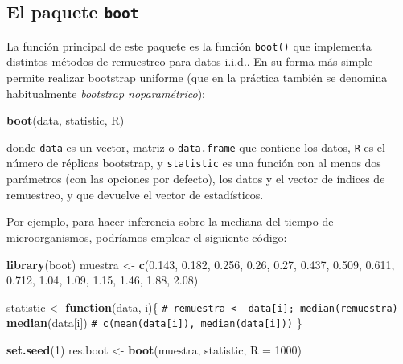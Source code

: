 \documentclass[
]{book}
\newenvironment{Shaded}{\begin{snugshade}}{\end{snugshade}}
\newcommand{\AttributeTok}[1]{\textcolor[rgb]{0.13,0.29,0.53}{#1}}
\newcommand{\CommentTok}[1]{\textcolor[rgb]{0.56,0.35,0.01}{\textit{#1}}}
\newcommand{\ControlFlowTok}[1]{\textcolor[rgb]{0.13,0.29,0.53}{\textbf{#1}}}
\newcommand{\DecValTok}[1]{\textcolor[rgb]{0.00,0.00,0.81}{#1}}
\newcommand{\FloatTok}[1]{\textcolor[rgb]{0.00,0.00,0.81}{#1}}
\newcommand{\FunctionTok}[1]{\textcolor[rgb]{0.13,0.29,0.53}{\textbf{#1}}}
\newcommand{\NormalTok}[1]{#1}
\newcommand{\OtherTok}[1]{\textcolor[rgb]{0.56,0.35,0.01}{#1}}
\theoremstyle{break}
\theoremstyle{nonumberplain}
\renewcommand{\CommentTok}[1]{\textcolor[rgb]{0.41,0.41,0.41}{\texttt{#1}}}
\begin{document}
\subsection{\texorpdfstring{El paquete \texttt{boot}}{El paquete boot}}\label{intro-pkgboot}

La función principal de este paquete es la función \texttt{boot()} que implementa distintos métodos de remuestreo para datos i.i.d..
En su forma más simple permite realizar bootstrap uniforme (que en la práctica también se denomina habitualmente \emph{bootstrap noparamétrico}):

\begin{Shaded}
\begin{Highlighting}[]
\FunctionTok{boot}\NormalTok{(data, statistic, R)}
\end{Highlighting}
\end{Shaded}

donde \texttt{data} es un vector, matriz o \texttt{data.frame} que contiene los datos,
\texttt{R} es el número de réplicas bootstrap, y \texttt{statistic} es una función
con al menos dos parámetros (con las opciones por defecto),
los datos y el vector de índices de remuestreo,
y que devuelve el vector de estadísticos.

Por ejemplo, para hacer inferencia sobre la mediana del tiempo de microorganismos,
podríamos emplear el siguiente código:

\begin{Shaded}
\begin{Highlighting}[]
\FunctionTok{library}\NormalTok{(boot)}
\NormalTok{muestra }\OtherTok{\textless{}{-}} \FunctionTok{c}\NormalTok{(}\FloatTok{0.143}\NormalTok{, }\FloatTok{0.182}\NormalTok{, }\FloatTok{0.256}\NormalTok{, }\FloatTok{0.26}\NormalTok{, }\FloatTok{0.27}\NormalTok{, }\FloatTok{0.437}\NormalTok{, }\FloatTok{0.509}\NormalTok{, }
             \FloatTok{0.611}\NormalTok{, }\FloatTok{0.712}\NormalTok{, }\FloatTok{1.04}\NormalTok{, }\FloatTok{1.09}\NormalTok{, }\FloatTok{1.15}\NormalTok{, }\FloatTok{1.46}\NormalTok{, }\FloatTok{1.88}\NormalTok{, }\FloatTok{2.08}\NormalTok{)}

\NormalTok{statistic }\OtherTok{\textless{}{-}} \ControlFlowTok{function}\NormalTok{(data, i)\{}
  \CommentTok{\# remuestra \textless{}{-} data[i]; median(remuestra)}
  \FunctionTok{median}\NormalTok{(data[i])}
  \CommentTok{\# c(mean(data[i]), median(data[i]))}
\NormalTok{\}}

\FunctionTok{set.seed}\NormalTok{(}\DecValTok{1}\NormalTok{)}
\NormalTok{res.boot }\OtherTok{\textless{}{-}} \FunctionTok{boot}\NormalTok{(muestra, statistic, }\AttributeTok{R =} \DecValTok{1000}\NormalTok{)}
\end{Highlighting}
\end{Shaded}
\end{document}
